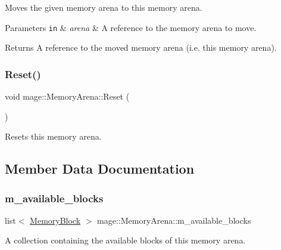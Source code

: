 Moves the given memory arena to this memory arena.


\begin{DoxyParams}[1]{Parameters}
\mbox{\tt in}  & {\em arena} & A reference to the memory arena to move. \\
\hline
\end{DoxyParams}
\begin{DoxyReturn}{Returns}
A reference to the moved memory arena (i.\+e. this memory arena). 
\end{DoxyReturn}
\hypertarget{classmage_1_1_memory_arena_a117b74c7bd5dfb28dfdaae6cab253491}{}\label{classmage_1_1_memory_arena_a117b74c7bd5dfb28dfdaae6cab253491} 
\subsubsection{\texorpdfstring{Reset()}{Reset()}}
{\footnotesize\ttfamily void mage\+::\+Memory\+Arena\+::\+Reset (\begin{DoxyParamCaption}{ }\end{DoxyParamCaption})}

Resets this memory arena. 

\subsection{Member Data Documentation}
\hypertarget{classmage_1_1_memory_arena_a74c0d5d40bb402ec52bb23b7ccb9fec5}{}\label{classmage_1_1_memory_arena_a74c0d5d40bb402ec52bb23b7ccb9fec5} 
\subsubsection{\texorpdfstring{m\+\_\+available\+\_\+blocks}{m\_available\_blocks}}
{\footnotesize\ttfamily list$<$ \hyperlink{classmage_1_1_memory_arena_a6026a114bb2ecc405dd5ebf54e4c12d5}{Memory\+Block} $>$ mage\+::\+Memory\+Arena\+::m\+\_\+available\+\_\+blocks\hspace{0.3cm}{\ttfamily [private]}}

A collection containing the available blocks of this memory arena. \hypertarget{classmage_1_1_memory_arena_a18177c245b045c5536330ffed284ed4d}{}\label{classmage_1_1_memory_arena_a18177c245b045c5536330ffed284ed4d} 
